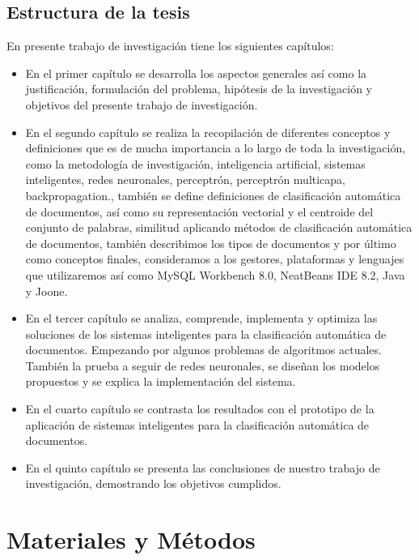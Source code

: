 \section{Estructura de la tesis}

En presente trabajo de investigación tiene los siguientes capítulos:

\begin{itemize}
 \item En el primer capítulo se desarrolla los aspectos generales así como la justificación, formulación del problema, hipótesis de la investigación y  objetivos del presente trabajo de investigación.
 \item En el segundo capítulo se realiza la recopilación de diferentes conceptos y definiciones que es de mucha importancia a lo largo de toda la investigación, como la metodología de investigación, inteligencia artificial, sistemas inteligentes, redes neuronales, perceptrón, perceptrón multicapa, backpropagation., también se define definiciones de clasificación automática de documentos, así como su representación vectorial y el centroide del conjunto de palabras, similitud aplicando métodos de clasificación automática de documentos, también describimos los tipos de documentos y por último como conceptos finales, consideramos a los gestores, plataformas y lenguajes que utilizaremos así como MySQL Workbench 8.0, NeatBeans IDE 8.2, Java y Joone.
 \item En el tercer capítulo se analiza, comprende, implementa  y optimiza las soluciones de los sistemas inteligentes para la clasificación automática de documentos. Empezando por algunos problemas de algoritmos actuales. También la prueba a seguir de redes neuronales, se diseñan los modelos propuestos y se explica la implementación del sistema.
 \item En el cuarto capítulo se contrasta los resultados con el prototipo de la aplicación de sistemas inteligentes para la clasificación automática de documentos.
 \item En el quinto capítulo se presenta las conclusiones de nuestro trabajo de investigación, demostrando los objetivos cumplidos.
\end{itemize}




\chapter{Materiales y Métodos}
\renewcommand{\baselinestretch}{2} %

